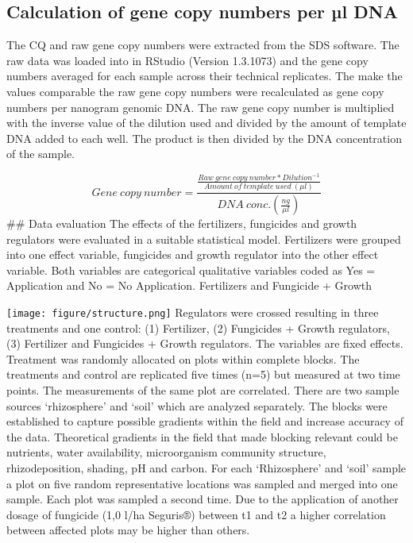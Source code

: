 \documentclass[twoside,12pt,final]{ucthesis-CA2012}
\begin{document}
\begin{ucmainmatter}
\hypertarget{calculation-of-gene-copy-numbers-per-uxb5l-dna}{%
\subsection{Calculation of gene copy numbers per µl DNA}\label{calculation-of-gene-copy-numbers-per-uxb5l-dna}}

The CQ and raw gene copy numbers were extracted from the SDS software. The raw data was loaded into in RStudio (Version 1.3.1073) and the gene copy numbers averaged for each sample across their technical replicates. The make the values comparable the raw gene copy numbers were recalculated as gene copy numbers per nanogram genomic DNA. The raw gene copy number is multiplied with the inverse value of the dilution used and divided by the amount of template DNA added to each well. The product is then divided by the DNA concentration of the sample.

\[ Gene\:copy\:number=\frac{\frac{Raw\:gene\:copy\:number*Dilution^{-1}}{Amount\:of\:template\:used\:(\mu l)}}{DNA\:conc.(\frac{ng}{\mu l})}\]
\#\# Data evaluation
The effects of the fertilizers, fungicides and growth regulators were evaluated in a suitable statistical model. Fertilizers were grouped into one effect variable, fungicides and growth regulator into the other effect variable. Both variables are categorical qualitative variables coded as Yes = Application and No = No Application. Fertilizers and Fungicide + Growth

\texttt{[image: figure/structure.png]}
Regulators were crossed resulting in three treatments and one control: (1) Fertilizer, (2) Fungicides + Growth regulators, (3) Fertilizer and Fungicides + Growth regulators. The variables are fixed effects. Treatment was randomly allocated on plots within complete blocks. The treatments and control are replicated five times (n=5) but measured at two time points. The measurements of the same plot are correlated.
There are two sample sources `rhizosphere' and `soil' which are analyzed separately. The blocks were established to capture possible gradients within the field and increase accuracy of the data. Theoretical gradients in the field that made blocking relevant could be nutrients, water availability, microorganism community structure, rhizodeposition, shading, pH and carbon. For each `Rhizosphere' and `soil' sample a plot on five random representative locations was sampled and merged into one sample. Each plot was sampled a second time.
Due to the application of another dosage of fungicide (1,0 l/ha Seguris®) between t1 and t2 a higher correlation between affected plots may be higher than others.


\end{ucmainmatter}
\end{document}
